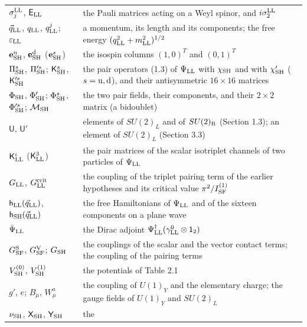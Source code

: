 \documentclass[
  10pt,
]{article}
\begin{document}
\begin{longtable}[]{@{}
  >{\raggedright\arraybackslash}p{}
  >{\raggedright\arraybackslash}p{}@{}}
\(\sigma^{\rm LL}_j\), \(\mathsf E_{\rm LL}\) & the Pauli matrices
acting on a Weyl spinor, and \(i\sigma^{\rm LL}_2\) \\
\(\vec q_{\rm LL}\), \(q_{\rm LL}\), \(q^j_{\rm LL}\);
\(\varepsilon_{\rm LL}\) & a momentum, its length and its components;
the free energy \((q_{\rm LL}^2+m_{\rm LL}^2)^{1/2}\) \\
\(\mathbf e^{\rm u}_{\rm SH}\), \(\mathbf e^{\rm d}_{\rm SH}\)
(\(\mathbf e^s_{\rm SH}\)) & the isospin columns \((1,0)^T\) and
\((0,1)^T\) \\
\(\Pi^s_{\rm SH}\), \(\Pi'^s_{\rm SH}\); \(\mathsf K^s_{\rm SH}\),
\(\mathsf K'^s_{\rm SH}\) & the pair operators (1.3) of
\(\Psi_{\rm LL}\) with \(\chi_{\rm SH}\) and with \(\chi'_{\rm SH}\)
(\(s={\rm u},{\rm d}\)), and their antisymmetric \(16\times16\)
matrices \\
\(\Phi_{\rm SH}\), \(\Phi'_{\rm SH}\); \(\Phi^s_{\rm SH}\),
\(\Phi'^s_{\rm SH}\); \(\mathcal M_{\rm SH}\) & the two pair fields,
their components, and their \(2\times2\) matrix (a bidoublet) \\
\(\mathsf U\), \(\mathsf U'\) & elements of \(SU(2)_L\) and of
\(SU(2)_{\rm R}\) (Section 1.3); an element of \(SU(2)_L\) (Section
3.3) \\
\(\mathsf K^\iota_{\rm LL}\) (\(\mathsf K^3_{\rm LL}\)) & the pair
matrices of the scalar isotriplet channels of two particles of
\(\Psi_{\rm LL}\) \\
\(G_{\rm LL}\), \(G^{\rm crit}_{\rm LL}\) & the coupling of the triplet
pairing term of the earlier hypotheses and its critical value
\(\pi^2/I^{(1)}_{\rm SF}\) \\
\(\mathsf h_{\rm LL}(\vec q_{\rm LL})\),
\(\mathsf h_{\rm SH}(\vec q_{\rm LL})\) & the free Hamiltonians of
\(\Psi_{\rm LL}\) and of the sixteen components on a plane wave \\
\(\bar\Psi_{\rm LL}\) & the Dirac adjoint
\(\Psi^\dagger_{\rm LL}(\gamma^0_{\rm LL}\otimes\mathsf 1_2)\) \\
\(G^{\rm S}_{\rm SF}\), \(G^{\rm V}_{\rm SF}\); \(G_{\rm SH}\) & the
couplings of the scalar and the vector contact terms; the coupling of
the pairing terms \\
\(V^{(0)}_{\rm SH}\), \(V^{(1)}_{\rm SH}\) & the potentials of Table
2.1 \\
\(g'\), \(e\); \(B_\mu\), \(W^a_\mu\) & the coupling of \(U(1)_Y\) and
the elementary charge; the gauge fields of \(U(1)_Y\) and \(SU(2)_L\) \\
\(\nu_{\rm SH}\), \(\mathsf X_{\rm SH}\), \(\mathsf Y_{\rm SH}\) & the

\end{longtable}
\end{document}
